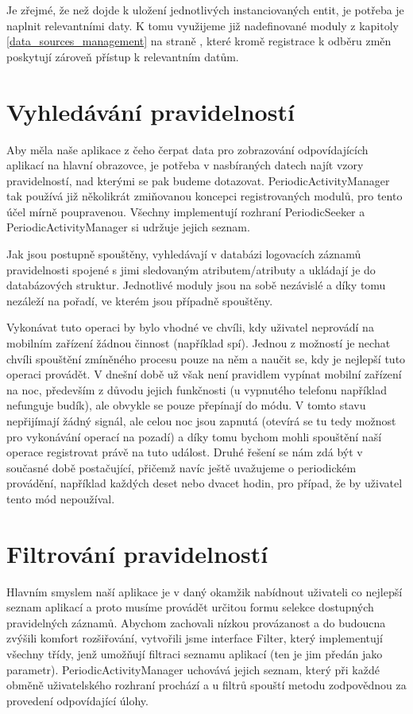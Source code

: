 \documentclass[thesis=M,czech]{FITthesis}[2012/06/26]
\begin{document}
Je zřejmé, že než dojde k uložení jednotlivých instanciovaných entit, je potřeba je naplnit relevantními daty. K tomu využijeme již nadefinované moduly z kapitoly \ref{data_sources_management} na straně \pageref{data_sources_management}, které kromě registrace k odběru změn poskytují zároveň přístup k relevantním datům.

\section{Vyhledávání pravidelností}
Aby měla naše aplikace z čeho čerpat data pro zobrazování odpovídajících aplikací na hlavní obrazovce, je potřeba v nasbíraných datech najít vzory pravidelností, nad kterými se pak budeme dotazovat. PeriodicActivityManager tak používá již několikrát zmiňovanou koncepci registrovaných modulů, pro tento účel mírně poupravenou. Všechny implementují rozhraní PeriodicSeeker a PeriodicActivityManager si udržuje jejich seznam.

Jak jsou postupně spouštěny, vyhledávají v databázi logovacích záznamů pravidelnosti spojené s jimi sledovaným atributem/atributy a ukládají je do databázových struktur. Jednotlivé moduly jsou na sobě nezávislé a díky tomu nezáleží na pořadí, ve kterém jsou případně spouštěny.

Vykonávat tuto operaci by bylo vhodné ve chvíli, kdy uživatel neprovádí na mobilním zařízení žádnou činnost (například spí). Jednou z možností je nechat chvíli spouštění zmíněného procesu pouze na něm a naučit se, kdy je nejlepší tuto operaci provádět. V dnešní době už však není pravidlem vypínat mobilní zařízení na noc, především z důvodu jejich funkčnosti (u vypnutého telefonu například nefunguje budík), ale obvykle se pouze přepínají do  módu. V tomto stavu nepřijímají žádný signál, ale celou noc jsou zapnutá (otevírá se tu tedy možnost pro vykonávání operací na pozadí) a díky tomu bychom mohli spouštění naší operace registrovat právě na tuto událost. Druhé řešení se nám zdá být v současné době postačující, přičemž navíc ještě uvažujeme o periodickém provádění, například každých deset nebo dvacet hodin, pro případ, že by uživatel tento mód nepoužíval.

\section{Filtrování pravidelností}
Hlavním smyslem naší aplikace je v daný okamžik nabídnout uživateli co nejlepší seznam aplikací a proto musíme provádět určitou formu selekce dostupných pravidelných záznamů. Abychom zachovali nízkou provázanost a do budoucna zvýšili komfort rozšiřování, vytvořili jsme interface Filter, který implementují všechny třídy, jenž umožňují filtraci seznamu aplikací (ten je jim předán jako parametr). PeriodicActivityManager uchovává jejich seznam, který při každé obměně uživatelského rozhraní prochází a u filtrů spouští metodu zodpovědnou za provedení odpovídající úlohy.
\end{document}
